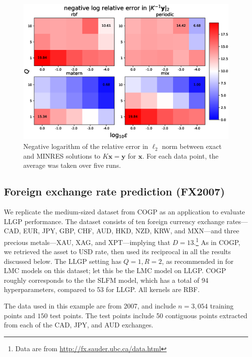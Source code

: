 \documentclass{article}
\def\Tx{\textbf{x}}
\def\Ty{\textbf{y}}
\begin{document}
\begin{figure}[!ht]
\vskip 0.1in
\begin{center}
\centerline{\includegraphics[width=\columnwidth]{relalpha_l2.eps}}
\caption{Negative logarithm of the relative error in $\ell_2$ norm between exact and MINRES solutions to $K\Tx=\Ty$ for $\Tx$. For each data point, the average was taken over five runs.}
\label{fig:inverr}
\end{center}
\vskip -0.1in
\end{figure}

\subsection{Foreign exchange rate prediction (FX2007)}\label{fx2007-results}

We replicate the medium-sized dataset from COGP as an application to evaluate LLGP performance. The dataset consists of ten foreign currency exchange rates---CAD, EUR, JPY, GBP, CHF, AUD, HKD, NZD, KRW, and MXN---and three precious metals---XAU, XAG, and XPT---implying that $D=13$.\footnote{Data are from \url{http://fx.sauder.ubc.ca/data.html}} As in COGP, we retrieved the asset to USD rate, then used its reciprocal in all the results discussed below. The LLGP setting has $Q=1,R=2$, as recommended in \cite{alvarez2010efficient} for LMC models on this dataset; let this be the LMC model on LLGP. COGP roughly corresponds to the the SLFM model, which has a total of 94 hyperparameters, compared to 53 for LLGP. All kernels are RBF.

The data used in this example are from 2007, and include $n=3,054$ training points and $150$ test points. The test points include 50 contiguous points extracted from each of the CAD, JPY, and AUD exchanges.
\end{document}
